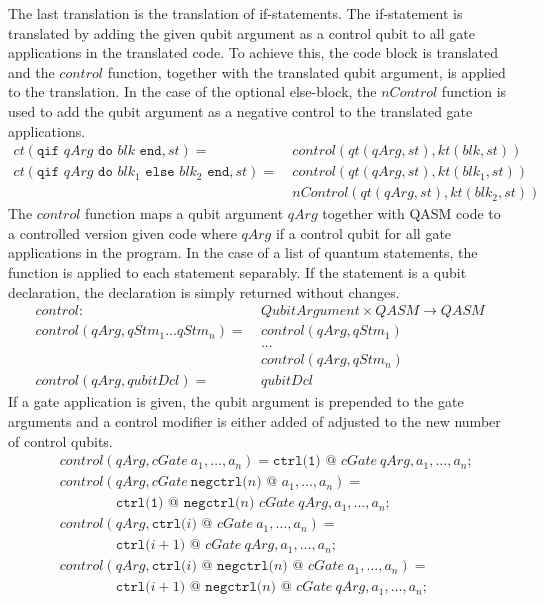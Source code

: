The last translation is the translation of if-statements. The if-statement is translated by adding the given qubit argument as a control qubit to all gate applications in the translated code. To achieve this, the code block is translated and the $control$ function, together with the translated qubit argument, is applied to the translation. In the case of the optional else-block, the $nControl$ function is used to add the qubit argument as a negative control to the translated gate applications.
\begin{align*}
        ct(\texttt{qif } qArg \texttt{ do } blk \texttt{ end}, st) = \ 
            &  control(qt(qArg, st), kt(blk, st)) \\
        ct(\texttt{qif } qArg \texttt{ do } blk_1 \texttt{ else } blk_2 \texttt{ end}, st) = \ 
            &  control(qt(qArg, st), kt(blk_1, st)) \\
            &  nControl(qt(qArg, st), kt(blk_2, st))
\end{align*}
The $control$ function maps a qubit argument $qArg$ together with QASM code to a controlled version given code where $qArg$ if a control qubit for all gate applications in the program. In the case of a list of quantum statements, the function is applied to each statement separably. If the statement is a qubit declaration, the declaration is simply returned without changes.
\begin{align*}
    control : \ & QubitArgument \times QASM \to QASM\\
    control(qArg, qStm_1 \dots qStm_n) = \ & control(qArg, qStm_1)\\
        & ...\\
        & control(qArg, qStm_n)\\
    control(qArg, qubitDcl) = \ & qubitDcl
\end{align*}
If a gate application is given, the qubit argument is prepended to the gate arguments and a control modifier is either added of adjusted to the new number of control qubits.
\begin{align*}
    &control(qArg, cGate \ a_1, \dots, a_n ) =  \texttt{ctrl(1) @ } cGate \ qArg, a_1, \dots, a_n\texttt{;}\\
    &control(qArg, cGate \ \texttt{negctrl(}n\texttt{) @ } a_1, \dots, a_n ) = \\
    & \quad \quad \quad \quad \texttt{ctrl(1) @ } \texttt{negctrl(}n\texttt{) }cGate \ qArg, a_1, \dots, a_n\texttt{;}\\
    &control(qArg, \texttt{ctrl(}i \texttt{) @ } cGate \ a_1, \dots, a_n ) = \\
    & \quad \quad \quad \quad \texttt{ctrl(}i+1 \texttt{) @ } cGate \ qArg, a_1, \dots, a_n\texttt{;}\\
    &control(qArg, \texttt{ctrl(}i \texttt{) @ } \texttt{negctrl(}n\texttt{) @ } cGate \ a_1, \dots, a_n ) = \\
    & \quad \quad \quad \quad \texttt{ctrl(}i+1 \texttt{) @ } \texttt{negctrl(}n\texttt{) @ } cGate \ qArg, a_1, \dots, a_n\texttt{;}
\end{align*}
